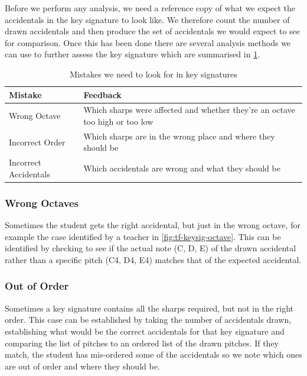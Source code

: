Before we perform any analysis, we need a reference copy of what we expect the accidentals in the key signature to look like. We therefore count the number of drawn accidentals and then produce the set of accidentals we would expect to see for comparison. Once this has been done there are several analysis methods we can use to further assess the key signature which are summarised in \cref{table:key-signature-errors}.

\begin{table}[H]
    \renewcommand{\arraystretch}{1.6}
    \begin{tabularx}{\textwidth}{ lX }
        \toprule
        Mistake & Feedback \\
        \midrule
        Wrong Octave & Which sharps were affected and whether they're an octave too high or too low \\
        Incorrect Order & Which sharps are in the wrong place and where they should be \\
        Incorrect Accidentals & Which accidentals are wrong and what they should be \\
        \bottomrule
    \end{tabularx}

    \caption{Mistakes we need to look for in key signatures}
    \label{table:key-signature-errors}
\end{table}

\subsubsection{Wrong Octaves}\label{sec:scoring-keysig-octave}

Sometimes the student gets the right accidental, but just in the wrong octave, for example the case identified by a teacher in \cref{fig:tf-keysig-octave}. This can be identified by checking to see if the actual note (C, D, E) of the drawn accidental rather than a specific pitch (C4, D4, E4) matches that of the expected accidental.

\subsubsection{Out of Order}\label{sec:scoring-keysig-order}

Sometimes a key signature contains all the sharps required, but not in the right order. This case can be established by taking the number of accidentals drawn, establishing what would be the correct accidentals for that key signature and comparing the list of pitches to an ordered list of the drawn pitches. If they match, the student has mis-ordered some of the accidentals so we note which ones are out of order and where they should be.

